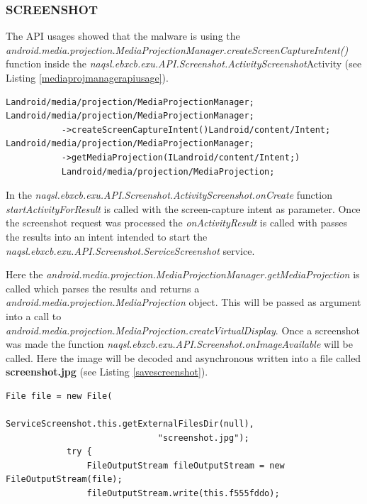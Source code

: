 \documentclass[10pt,titlepage]{article}
\begin{document}
\newpage
\subsubsection{SCREENSHOT} \label{screenshot}
The API usages showed that the malware is using the 
\\ \textit{android.media.projection.MediaProjectionManager.createScreenCaptureIntent()} function inside the \textit{naqsl.ebxcb.exu.API.Screenshot.ActivityScreenshot}Activity (see Listing \ref{mediaprojmanagerapiusage}). 

\begin{lstlisting}[label=mediaprojmanagerapiusage,caption=List of calls to \textit{android.media.projection.MediaProjectionManager.createScreenCaptureIntent} tells that the malware tries to do screenshots.,frame=tb]
Landroid/media/projection/MediaProjectionManager;
Landroid/media/projection/MediaProjectionManager;
           ->createScreenCaptureIntent()Landroid/content/Intent;
Landroid/media/projection/MediaProjectionManager;
           ->getMediaProjection(ILandroid/content/Intent;)
           Landroid/media/projection/MediaProjection;
\end{lstlisting}

In the \textit{naqsl.ebxcb.exu.API.Screenshot.ActivityScreenshot.onCreate}
function \textit{startActivityForResult} is called with the screen-capture intent as parameter. Once the screenshot request was processed the \textit{onActivityResult} is called with passes the results into an intent intended to start the \textit{naqsl.ebxcb.exu.API.Screenshot.ServiceScreenshot} service.

Here the \textit{android.media.projection.MediaProjectionManager.getMediaProjection}
is called which parses the results and returns a \textit{android.media.projection.MediaProjection} object. This will be passed as argument into a call to 
\\ \textit{android.media.projection.MediaProjection.createVirtualDisplay}. Once a screenshot was made the function \textit{naqsl.ebxcb.exu.API.Screenshot.onImageAvailable} will be called. Here the image will be decoded and asynchronous written into a file called \textbf{screenshot.jpg} (see Listing \ref{savescreenshot}).
\begin{lstlisting}[label=savescreenshot,caption=The malware stores the screenshot into the external files dir with filename \textbf{screenshot.jpg}.,frame=tb]
            File file = new File(
                              ServiceScreenshot.this.getExternalFilesDir(null),
                              "screenshot.jpg");
            try {
                FileOutputStream fileOutputStream = new FileOutputStream(file);
                fileOutputStream.write(this.f555fddo);
\end{lstlisting}
\end{document}
